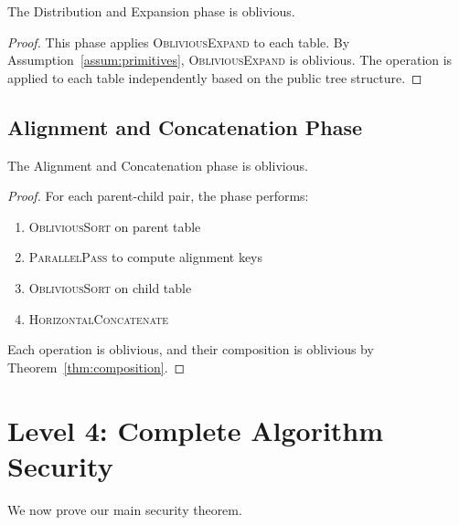 \begin{lemma}
\label{lem:expand-oblivious}
The Distribution and Expansion phase is oblivious.
\end{lemma}

\begin{proof}
This phase applies \textsc{ObliviousExpand} to each table. By Assumption~\ref{assum:primitives}, \textsc{ObliviousExpand} is oblivious. The operation is applied to each table independently based on the public tree structure.\end{proof}

\subsection{Alignment and Concatenation Phase}

\begin{lemma}
\label{lem:align-oblivious}
The Alignment and Concatenation phase is oblivious.
\end{lemma}

\begin{proof}
For each parent-child pair, the phase performs:
\begin{enumerate}
\item \textsc{ObliviousSort} on parent table
\item \textsc{ParallelPass} to compute alignment keys
\item \textsc{ObliviousSort} on child table
\item \textsc{HorizontalConcatenate}
\end{enumerate}
Each operation is oblivious, and their composition is oblivious by Theorem~\ref{thm:composition}.\end{proof}

\section{Level 4: Complete Algorithm Security}

We now prove our main security theorem.

